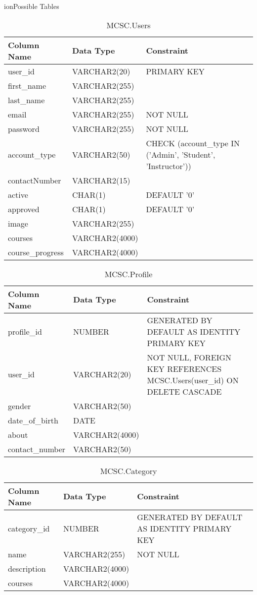 ion{Possible  Tables}
\begin{table}[ht]
\centering
\begin{tabular}{|l|l|l|}
\hline
\textbf{Column Name} & \textbf{Data Type} & \textbf{Constraint} \\ \hline
user\_id & VARCHAR2(20) & PRIMARY KEY \\ \hline
first\_name & VARCHAR2(255) &  \\ \hline
last\_name & VARCHAR2(255) &  \\ \hline
email & VARCHAR2(255) & NOT NULL \\ \hline
password & VARCHAR2(255) & NOT NULL \\ \hline
account\_type & VARCHAR2(50) & CHECK (account\_type IN ('Admin', 'Student', 'Instructor')) \\ \hline
contactNumber & VARCHAR2(15) &  \\ \hline
active & CHAR(1) & DEFAULT '0' \\ \hline
approved & CHAR(1) & DEFAULT '0' \\ \hline
image & VARCHAR2(255) &  \\ \hline
courses & VARCHAR2(4000) &  \\ \hline
course\_progress & VARCHAR2(4000) &  \\ \hline
\end{tabular}
\caption{MCSC.Users}
\end{table}
\begin{table}[ht]
\centering
\begin{tabular}{|l|l|l|}
\hline
\textbf{Column Name} & \textbf{Data Type} & \textbf{Constraint} \\ \hline
profile\_id & NUMBER & GENERATED BY DEFAULT AS IDENTITY PRIMARY KEY \\ \hline
user\_id & VARCHAR2(20) & NOT NULL, FOREIGN KEY REFERENCES MCSC.Users(user\_id) ON DELETE CASCADE \\ \hline
gender & VARCHAR2(50) &  \\ \hline
date\_of\_birth & DATE &  \\ \hline
about & VARCHAR2(4000) &  \\ \hline
contact\_number & VARCHAR2(50) &  \\ \hline
\end{tabular}
\caption{MCSC.Profile}
\end{table}
\begin{table}[ht]
\centering
\begin{tabular}{|l|l|l|}
\hline
\textbf{Column Name} & \textbf{Data Type} & \textbf{Constraint} \\ \hline
category\_id & NUMBER & GENERATED BY DEFAULT AS IDENTITY PRIMARY KEY \\ \hline
name & VARCHAR2(255) & NOT NULL \\ \hline
description & VARCHAR2(4000) &  \\ \hline
courses & VARCHAR2(4000) &  \\ \hline
\end{tabular}
\caption{MCSC.Category}
\end{table}
